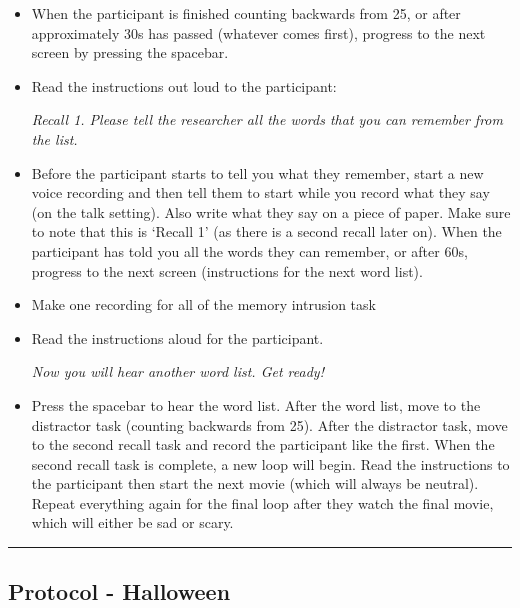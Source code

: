 \documentclass[]{book}
\begin{document}
\begin{itemize}
\item
  When the participant is finished counting backwards from 25, or after approximately 30s has passed (whatever comes first), progress to the next screen by pressing the spacebar.
\item
  Read the instructions out loud to the participant:

  \emph{Recall 1. Please tell the researcher all the words that you can remember from the list.}
\item
  Before the participant starts to tell you what they remember, start a new voice recording and then tell them to start while you record what they say (on the talk setting). Also write what they say on a piece of paper. Make sure to note that this is `Recall 1' (as there is a second recall later on). When the participant has told you all the words they can remember, or after 60s, progress to the next screen (instructions for the next word list).
\item
  Make one recording for all of the memory intrusion task
\item
  Read the instructions aloud for the participant.

  \emph{Now you will hear another word list. Get ready!}
\item
  Press the spacebar to hear the word list. After the word list, move to the distractor task (counting backwards from 25). After the distractor task, move to the second recall task and record the participant like the first. When the second recall task is complete, a new loop will begin. Read the instructions to the participant then start the next movie (which will always be neutral). Repeat everything again for the final loop after they watch the final movie, which will either be sad or scary.
\end{itemize}

\begin{center}\rule{0.5\linewidth}{0.5pt}\end{center}

\hypertarget{protocol---halloween}{%
\subsection{Protocol - Halloween}\label{protocol---halloween}}
\end{document}
